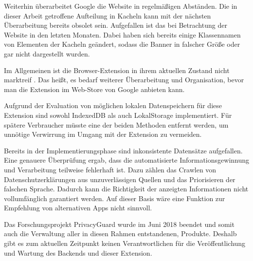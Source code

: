 Weiterhin überarbeitet Google die Website in regelmäßigen Abständen. Die in dieser Arbeit getroffene Aufteilung in Kacheln kann mit der nächsten Überarbeitung bereits obsolet sein. Aufgefallen ist das bei Betrachtung der Website in den letzten Monaten. Dabei haben sich bereits einige Klassennamen von Elementen der Kacheln geändert, sodass die Banner in falscher Größe oder gar nicht dargestellt wurden.

Im Allgemeinen ist die Browser-Extension in ihrem aktuellen Zustand nicht \glqq marktreif \grqq{}. Das heißt, es bedarf weiterer Überarbeitung und Organisation, bevor man die Extension im Web-Store von Google anbieten kann. 

Aufgrund der Evaluation von möglichen lokalen Datenspeichern für diese Extension sind sowohl \glqq IndexedDB\grqq{} als auch \glqq LokalStorage\grqq{} implementiert. Für spätere Verbraucher müsste eine der beiden Methoden entfernt werden, um unnötige Verwirrung im Umgang mit der Extension zu vermeiden.

Bereits in der Implementierungsphase sind inkonsistente Datensätze aufgefallen. Eine genauere Überprüfung ergab, dass die automatisierte Informationsgewinnung und Verarbeitung teilweise fehlerhaft ist. Dazu zählen das Crawlen von Datenschutzerklärungen aus unzuverlässigen Quellen und das Priorisieren der falschen Sprache. Dadurch kann die Richtigkeit der anzeigten Informationen nicht vollumfänglich garantiert werden. Auf dieser Basis wäre eine Funktion zur Empfehlung von alternativen Apps nicht sinnvoll.

Das Forschungsprojekt PrivacyGuard wurde im Juni 2018 beendet und somit auch die Verwaltung aller in diesen Rahmen entstandenen, Produkte. Deshalb gibt es zum aktuellen Zeitpunkt keinen Verantwortlichen für die Veröffentlichung und Wartung des Backends und dieser Extension.